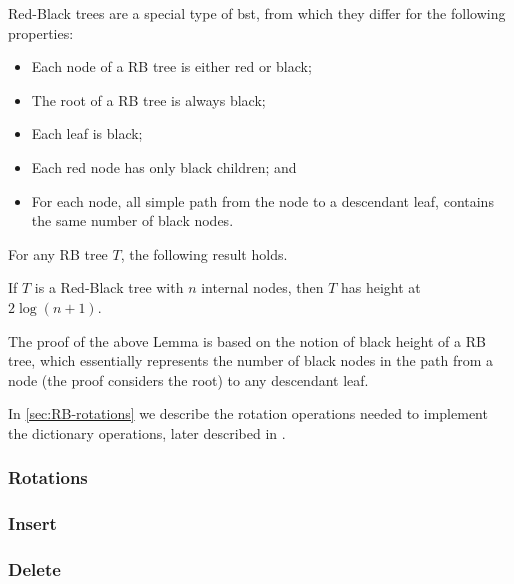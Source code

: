 \documentclass{subfiles}
\begin{document}
    Red-Black trees are a special type of \gls{bst},
        from which they differ for the following properties:
        \begin{itemize}
            \item Each node of a RB tree is either red or black;
            \item The root of a RB tree is always black;
            \item Each leaf is black;
            \item Each red node has only black children; and 
            \item For each node, all simple path from the node to a descendant leaf,
                contains the same number of black nodes.
        \end{itemize}
    
    For any RB tree \(T\), the following result holds.
    \begin{lemma*}
        If \(T\) is a Red-Black tree with \(n\) internal nodes, 
            then \(T\) has height at \(2 \log(n + 1)\).        
    \end{lemma*}
    The proof of the above Lemma is based on the notion of black height of a RB tree,
        which essentially represents the number of black nodes in the path from 
        a node (the proof considers the root) to any descendant leaf.

    In \cref{sec:RB-rotations} we describe the rotation operations needed to implement the dictionary  
        operations, later described in .

    \subsubsection{Rotations}
    

    \subsubsection{Insert}
    
    
    \subsubsection{Delete}
    
\end{document}
